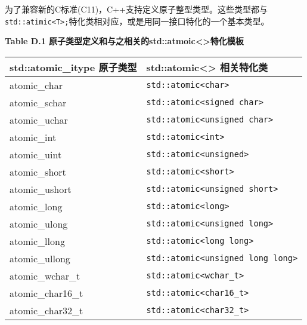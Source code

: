 
为了兼容新的C标准(C11)，C++支持定义原子整型类型。这些类型都与\texttt{std::atimic<T>;}特化类相对应，或是用同一接口特化的一个基本类型。

\textbf{Table D.1 原子类型定义和与之相关的std::atmoic<>特化模板}


\begin{table}[htbp]
    \begin{tabular}{|l|l|}
        \hline
        \textbf{std::atomic\_itype 原子类型} & \textbf{std::atomic<> 相关特化类} \\
        \hline
        atomic\_char & \texttt{std::atomic<char>} \\
        atomic\_schar & \texttt{std::atomic<signed char>} \\
        atomic\_uchar & \texttt{std::atomic<unsigned char>} \\
        atomic\_int & \texttt{std::atomic<int>} \\
        atomic\_uint & \texttt{std::atomic<unsigned>} \\
        atomic\_short & \texttt{std::atomic<short>} \\
        atomic\_ushort & \texttt{std::atomic<unsigned short>} \\
        atomic\_long & \texttt{std::atomic<long>} \\
        atomic\_ulong & \texttt{std::atomic<unsigned long>} \\
        atomic\_llong & \texttt{std::atomic<long long>} \\
        atomic\_ullong & \texttt{std::atomic<unsigned long long>} \\
        atomic\_wchar\_t & \texttt{std::atomic<wchar\_t>} \\
        atomic\_char16\_t & \texttt{std::atomic<char16\_t>} \\
        atomic\_char32\_t & \texttt{std::atomic<char32\_t>} \\
        \hline
    \end{tabular}
\end{table}

